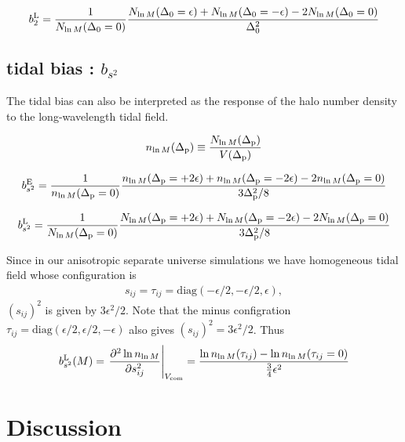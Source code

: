 \documentclass[a4paper,11pt]{article}
\begin{document}
\begin{align}
b^{\rm L}_{2}
= \frac{1}{N_{\ln{M}}(\Delta_0=0)}
\frac{N_{\ln{M}}(\Delta_0=\epsilon)
+
N_{\ln{M}}(\Delta_0=-\epsilon)
-2N_{\ln{M}}(\Delta_0=0)}{\Delta^2_0}
\end{align}


\subsection{tidal bias : $b_{s^2}$}

The tidal bias can also be interpreted as the response of the halo number density
to the long-wavelength tidal field.

\begin{align}
n_{\ln{M}}(\Delta_{\rm p}) \equiv
\frac{N_{\ln{M}}(\Delta_{\rm p})}{V(\Delta_{\rm p})}
\end{align}

\begin{align}
b^{\rm E}_{s^2}
= \frac{1}{n_{\ln{M}}(\Delta_{\rm p}=0)}
\frac{n_{\ln{M}}(\Delta_{\rm p}=+2\epsilon)
+
n_{\ln{M}}(\Delta_{\rm p}=-2\epsilon)
-2n_{\ln{M}}(\Delta_{\rm p}=0)}{3\Delta^2_{\rm p}/8}
\end{align}


\begin{align}
b^{\rm L}_{s^2}
= \frac{1}{N_{\ln{M}}(\Delta_{\rm p}=0)}
\frac{N_{\ln{M}}(\Delta_{\rm p}=+2\epsilon)
+
N_{\ln{M}}(\Delta_{\rm p}=-2\epsilon)
-2N_{\ln{M}}(\Delta_{\rm p}=0)}{3\Delta^2_{\rm p}/8}
\end{align}


Since in our anisotropic separate universe simulations we have homogeneous tidal field whose configuration is 
\begin{align}
s_{ij} = \tau_{ij} = \mathrm{diag}(-\epsilon/2,-\epsilon/2,\epsilon),
\end{align}
$(s_{ij})^2$ is given by $3\epsilon^2/2$.
Note that the minus configration $\tau_{ij} = \mathrm{diag}(\epsilon/2,\epsilon/2,-\epsilon)$ also gives $(s_{ij})^2 = 3\epsilon^2/2$.
Thus 
\begin{align}
b_{s^2}^{\rm L}(M) = \left.\frac{\partial^2 \ln{ n_{\ln{M} } } }{\partial s_{ij}^2}\right|_{V_{\rm com}}=
\frac{\ln{ n_{\ln{M} }(\tau_{ij}) } -\ln{ n_{\ln{M} }(\tau_{ij}=0) }  }{\frac{3}{4}\epsilon^2}
\end{align}

\section{Discussion}
\label{sec:discuss}
\end{document}
